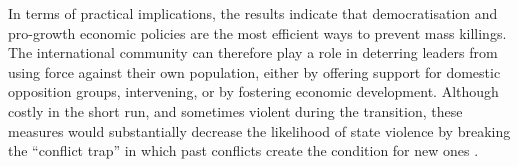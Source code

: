 \documentclass[a4paper,12pt]{article}
\begin{document}
In terms of practical implications, the results indicate that democratisation and pro-growth economic policies are the most efficient ways to prevent mass killings. The international community can therefore play a role in deterring leaders from using force against their own population, either by offering support for domestic opposition groups, intervening, or by fostering economic development. Although costly in the short run, and sometimes violent during the transition, these measures would substantially decrease the likelihood of state violence by breaking the ``conflict trap'' in which past conflicts create the condition for new ones \citep{collier2003breaking}.

\newpage
	


\end{document}
